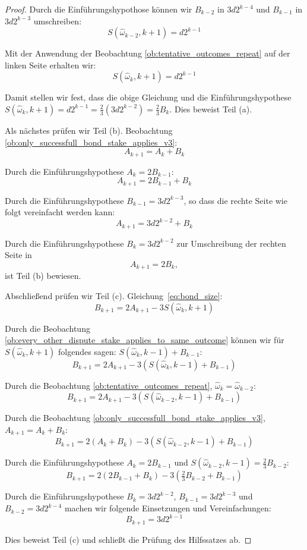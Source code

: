 \documentclass[floatfix,reprint,nofootinbib,amsmath,amssymb,epsfig,pre,floats,letterpaper,groupedaffiliation]{revtex4-1}
\theoremstyle{definition}
\theoremstyle{definition}
\theoremstyle{definition}
\begin{document}
\begin{appendix}
\begin{proof}
Durch die Einführungshypothose können wir $B_{k-2}$ in $3d2^{k-4}$ und $B_{k-1}$ in $3d2^{k-3}$ umschreiben:
\[ S(\hat{\omega}_{k-2},k+1)=d2^{k-1} \]

Mit der Anwendung der Beobachtung \ref{ob:tentative_outcomes_repeat} auf der linken Seite erhalten wir:
\[ S(\hat{\omega}_{k},k+1)=d2^{k-1} \]

Damit stellen wir fest, dass die obige Gleichung und die Einführungshypothese $S(\hat{\omega}_{k},k+1)=d2^{k-1}=\frac{2}{3}(3d2^{k-2})=\frac{2}{3}B_{k}$. Dies beweist Teil (a).

Als nächstes prüfen wir Teil (b). Beobachtung \ref{ob:only_successfull_bond_stake_applies_v3}:
\[ A_{k+1}=A_{k}+B_{k} \]

Durch die Einführungshypothese $A_{k}=2B_{k-1}$:
\[ A_{k+1}=2B_{k-1}+B_{k} \]

Durch die Einführungshypothese $B_{k-1}=3d2^{k-3}$, so dass die rechte Seite wie folgt vereinfacht werden kann:
\[ A_{k+1}=3d2^{k-2}+B_k \]

Durch die Einführungshypothese $B_{k}=3d2^{k-2}$ zur Umschreibung der rechten Seite in
\[ A_{k+1}=2B_{k}, \]
ist Teil (b) bewiesen.

Abschließend prüfen wir Teil (c). Gleichung~\ref{eq:bond_size}:
\[ B_{k+1}=2A_{k+1}-3S(\hat{\omega}_{k},k+1) \]

Durch die Beobachtung \ref{ob:every_other_dispute_stake_applies_to_same_outcome} können wir für $S(\hat{\omega}_{k},k+1)$ folgendes sagen: $S(\hat{\omega}_{k},k-1)+B_{k-1}$:
\[ B_{k+1}=2A_{k+1}-3\left(S(\hat{\omega}_{k},k-1)+B_{k-1}\right) \]

Durch die Beobachtung \ref{ob:tentative_outcomes_repeat}, $\hat{\omega}_{k}=\hat{\omega}_{k-2}$:
\[ B_{k+1}=2A_{k+1}-3\left(S(\hat{\omega}_{k-2},k-1)+B_{k-1}\right) \]

Durch die Beobachtung \ref{ob:only_successfull_bond_stake_applies_v3}, $A_{k+1}=A_{k}+B_{k}$:
\[ B_{k+1}=2\left(A_{k}+B_{k}\right)-3\left(S(\hat{\omega}_{k-2},k-1)+B_{k-1}\right) \]

Durch die Einführungshypothese $A_{k}=2B_{k-1}$ und $S(\hat{\omega}_{k-2},k-1)=\frac{2}{3}B_{k-2}$:
\[ B_{k+1}=2\left(2B_{k-1}+B_{k}\right)-3\left(\tfrac{2}{3}B_{k-2}+B_{k-1}\right) \]

Durch die Einführungshypothese $B_{k}=3d2^{k-2}$, $B_{k-1}=3d2^{k-3}$ und $B_{k-2}=3d2^{k-4}$ machen wir folgende Einsetzungen und Vereinfachungen:
\[ B_{k+1}=3d2^{k-1} \]

Dies beweist Teil (c) und schließt die Prüfung des Hilfssatzes ab.
\end{proof}


\end{appendix}
\end{document}
